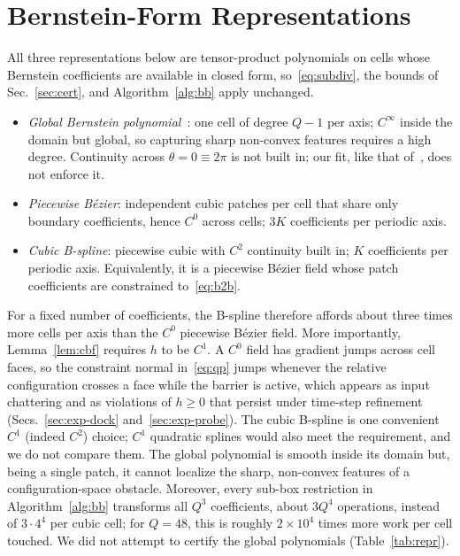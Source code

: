 \documentclass[journal]{IEEEtran}
\theoremstyle{definition}
\begin{document}
\section{Bernstein-Form Representations}\label{sec:repr}
All three representations below are tensor-product polynomials on cells whose Bernstein
coefficients are available in closed form, so~\eqref{eq:subdiv}, the bounds of Sec.~\ref{sec:cert},
and Algorithm~\ref{alg:bb} apply unchanged.
\begin{itemize}
\item \emph{Global Bernstein polynomial}~\cite{jo2026geometry,li2024representing}: one cell of degree
$Q-1$ per axis; $C^\infty$ inside the domain but global, so capturing sharp non-convex features
requires a high degree. Continuity across $\theta=0\equiv2\pi$ is not built in; our fit, like that
of~\cite{jo2026geometry}, does not enforce it.
\item \emph{Piecewise B\'ezier}: independent cubic patches per cell that share only boundary
coefficients, hence $C^0$ across cells; $3K$ coefficients per periodic axis.
\item \emph{Cubic B-spline}: piecewise cubic with $C^2$ continuity built in; $K$ coefficients per
periodic axis. Equivalently, it is a piecewise B\'ezier field whose patch coefficients are
constrained to~\eqref{eq:b2b}.
\end{itemize}
For a fixed number of coefficients, the B-spline therefore affords about three times more cells per
axis than the $C^0$ piecewise B\'ezier field. More importantly, Lemma~\ref{lem:cbf} requires $h$ to
be $C^1$. A $C^0$ field has gradient jumps across cell faces, so the constraint normal
in~\eqref{eq:qp} jumps whenever the relative configuration crosses a face while the barrier is
active, which appears as input chattering and as violations of $h\ge0$ that persist under
time-step refinement (Secs.~\ref{sec:exp-dock} and~\ref{sec:exp-probe}). The cubic B-spline is one convenient $C^1$ (indeed $C^2$) choice;
$C^1$ quadratic splines would also meet the requirement, and we do not compare them. The global
polynomial is smooth inside its domain but, being a single patch, it cannot localize the sharp,
non-convex features of a configuration-space obstacle. Moreover, every sub-box restriction in
Algorithm~\ref{alg:bb} transforms all $Q^3$ coefficients, about $3Q^4$ operations, instead of
$3\cdot4^4$ per cubic cell; for $Q=48$, this is roughly $2\times10^4$ times more work per cell
touched. We did not attempt to certify the global polynomials (Table~\ref{tab:repr}).
\end{document}
